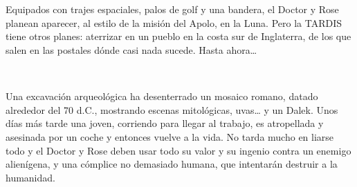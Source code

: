 \chapter*{}

Equipados con trajes espaciales, palos de golf y una bandera, el Doctor
y Rose planean aparecer, al estilo de la misión del Apolo, en la Luna.
Pero la TARDIS tiene otros planes: aterrizar en un pueblo en la costa
sur de Inglaterra, de los que salen en las postales dónde casi nada
sucede. Hasta ahora\ldots{}

~

Una excavación arqueológica ha desenterrado un mosaico romano, datado
alrededor del 70 d.C., mostrando escenas mitológicas, uvas\ldots{} y un
Dalek. Unos días más tarde una joven, corriendo para llegar al trabajo,
es atropellada y asesinada por un coche y entonces vuelve a la vida. No
tarda mucho en liarse todo y el Doctor y Rose deben usar todo su valor y
su ingenio contra un enemigo alienígena, y una cómplice no demasiado
humana, que intentarán destruir a la humanidad.